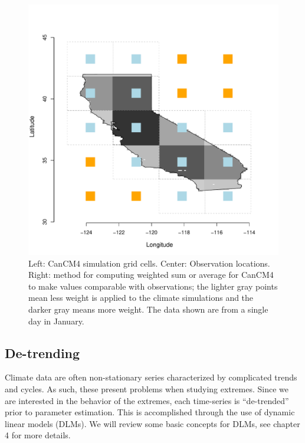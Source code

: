 \begin{figure}
\begin{center}
\includegraphics[scale=0.26]{figs/cal_mod_box3.pdf}
\end{center}
\caption{Left: CanCM4 simulation grid cells. Center: Observation locations. Right: method for computing weighted sum or average for CanCM4 to make values comparable with observations; the lighter gray points mean less weight is applied to the climate simulations and the darker gray means more weight. The data shown are from a single day in January.}
\label{weight}
\end{figure}



\subsection{De-trending}
\label{anomaly}

Climate data are often non-stationary series characterized by complicated trends and cycles. As such, these present problems when studying extremes. Since we are interested in the behavior of the extremes, each time-series is ``de-trended'' prior to parameter estimation. This is accomplished through the use of dynamic linear models (DLMs). We will review some basic concepts for DLMs, see \cite{prado2010time} chapter 4 for more details.

